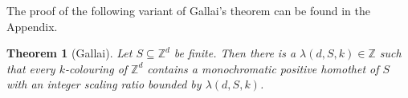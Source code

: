 \documentclass[12pt]{article}
\newcommand{\setbuilder}[2]{\left\{#1\ \colon #2\right\}}
\newcommand{\Z}{{\mathbb Z}}
\theoremstyle{plain}
\newtheorem{theorem}{Theorem}
\newtheorem{lemma}[theorem]{Lemma}
\theoremstyle{definition}
\begin{document}









The proof of the following variant of Gallai's theorem can be found in the Appendix.

\begin{theorem}[Gallai]\label{gallaiZ} Let $S\subseteq\mathbb{Z}^d$  be finite. Then there is a $\lambda(d,S,k)\in \mathbb{Z}$ such that every $k$-colouring of $\mathbb{Z}^d$ contains a monochromatic positive homothet of $S$ with an integer scaling ratio bounded by $\lambda(d,S,k)$.
\end{theorem}
\end{document}
